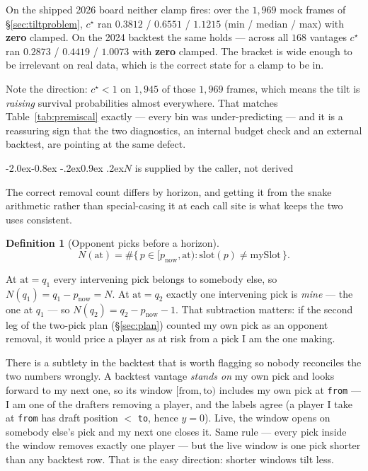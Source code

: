 \documentclass[10pt,a4paper]{article}
\makeatletter
\theoremstyle{plain}
\theoremstyle{definition}
\newtheorem{definition}[theorem]{Definition}
\theoremstyle{remark}
\newcommand{\code}[1]{\texttt{\small #1}}
\renewcommand\subsection{\@startsection{subsection}{2}{\z@}%
  {-2.0ex\@plus -0.8ex \@minus -.2ex}{0.9ex \@plus .2ex}{\normalfont\large\bfseries}}
\makeatother
\begin{document}
On the shipped 2026 board neither clamp fires: over the $1{,}969$ mock frames of
\S\ref{sec:tiltproblem}, $c^\star$ ran $0.3812$ / $0.6551$ / $1.1215$ (min / median / max)
with \textbf{zero} clamped. On the 2024 backtest the same holds --- across all $168$
vantages $c^\star$ ran $0.2873$ / $0.4419$ / $1.0073$ with \textbf{zero} clamped. The
bracket is wide enough to be irrelevant on real data, which is the correct state for a
clamp to be in.

Note the direction: $c^\star < 1$ on $1{,}945$ of those $1{,}969$ frames, which means the
tilt is \emph{raising} survival probabilities almost everywhere. That matches
Table~\ref{tab:premiscal} exactly
--- every bin was under-predicting --- and it is a reassuring sign that the two
diagnostics, an internal budget check and an external backtest, are pointing at the same
defect.

\subsection{$N$ is supplied by the caller, not derived}

The correct removal count differs by horizon, and getting it from the snake arithmetic
rather than special-casing it at each call site is what keeps the two uses consistent.

\begin{definition}[Opponent picks before a horizon]
\begin{equation}
N(\text{at}) = \#\{\,p \in [p_{\text{now}}, \text{at}) : \mathrm{slot}(p) \ne \text{mySlot}\,\}.
\label{eq:oppbefore}
\end{equation}
\end{definition}

At $\text{at} = q_1$ every intervening pick belongs to somebody else, so
$N(q_1) = q_1 - p_{\text{now}} = N$. At $\text{at} = q_2$ exactly one intervening pick
is \emph{mine} --- the one at $q_1$ --- so $N(q_2) = q_2 - p_{\text{now}} - 1$. That
subtraction matters: if the second leg of the two-pick plan (\S\ref{sec:plan}) counted my
own pick as an opponent removal, it would price a player as at risk from a pick I am the
one making.

There is a subtlety in the backtest that is worth flagging so nobody reconciles the two
numbers wrongly. A backtest vantage \emph{stands on} my own pick and looks forward to my
next one, so its window $[\text{from}, \text{to})$ includes my own pick at
\code{from} --- I am one of the drafters removing a player, and the labels agree (a
player I take at \code{from} has draft position $<$ \code{to}, hence $y = 0$). Live, the
window opens on somebody else's pick and my next one closes it. Same rule --- every pick
inside the window removes exactly one player --- but the live window is one pick shorter
than any backtest row. That is the easy direction: shorter windows tilt less.
\end{document}
